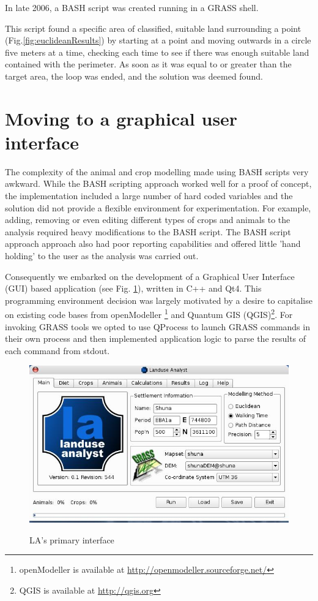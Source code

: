 In late 2006, a BASH script was created running in a GRASS shell.

This script found a specific area of classified, suitable land surrounding a
point (Fig.\ref{fig:euclideanResults})  by starting at a point and moving
outwards in a circle five meters at a time, checking each time to see if there
was enough suitable land contained with the perimeter.  As soon as it was equal
to or greater than the target area, the loop was ended, and the solution was
deemed found.

\section{Moving to a graphical user interface} \label{GUI} 
 
The complexity of the animal and crop modelling made using BASH scripts very
awkward.  While the BASH scripting approach worked well for a proof of concept,
the implementation included a large number of hard coded variables and the
solution did not provide a flexible environment for experimentation. For
example, adding, removing or even editing different types of crops and animals
to the analysis required heavy modifications to the BASH script.  The BASH
script approach approach also had poor reporting capabilities and offered
little 'hand holding' to the user as the analysis was carried out.

Consequently we embarked on the development of a Graphical User Interface (GUI)
based application (see Fig. \ref{fig:la544}), written in C++ and Qt4. This
programming environment decision was largely motivated by a desire to
capitalise on existing code bases from openModeller \footnote{openModeller is
available at \url{http://openmodeller.sourceforge.net/}} and Quantum GIS
(QGIS)\footnote{QGIS is available at \url{http://qgis.org}}.  For invoking
GRASS tools we opted to use QProcess to launch GRASS commands in their own
process and then implemented application logic to parse the results of each
command from stdout.

\begin{figure}[htbp] %
  \includegraphics[scale=0.36]{./images/LanduseAnalyst544.jpg}
   \label{fig:la544} \caption{LA's primary interface}
   \end{figure}


